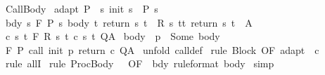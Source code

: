\begin{isabellebody}
%
\endisatagproof
{\isafoldproof}%
%
\isadelimproof
\isanewline
%
\endisadelimproof
\isanewline
{}\isamarkupfalse%
\ CallBody{\isacharcolon}\isanewline
{}\ adapt{\isacharcolon}\ {\isachardoublequoteopen}P\ {\isasymsubseteq}\ {\isacharbraceleft}s{\isachardot}\ init\ s\ {\isasymin}\ P{\isacharprime}\ s{\isacharbraceright}{\isachardoublequoteclose}\isanewline
{}\ bdy{\isacharcolon}\ {\isachardoublequoteopen}{\isasymforall}s{\isachardot}\ {\isasymGamma}{\isacharcomma}{\isasymTheta}{\isasymturnstile}\isactrlbsub {\isacharslash}F\isactrlesub \ {\isacharparenleft}P{\isacharprime}\ s{\isacharparenright}\ body\ {\isacharbraceleft}t{\isachardot}\ return\ s\ t\ {\isasymin}\ R\ s\ t{\isacharbraceright}{\isacharcomma}{\isacharbraceleft}t{\isachardot}\ return\ s\ t\ {\isasymin}\ A{\isacharbraceright}{\isachardoublequoteclose}\isanewline
{}\ c{\isacharcolon}\ {\isachardoublequoteopen}{\isasymforall}s\ t{\isachardot}\ {\isasymGamma}{\isacharcomma}{\isasymTheta}{\isasymturnstile}\isactrlbsub {\isacharslash}F\isactrlesub \ {\isacharparenleft}R\ s\ t{\isacharparenright}\ {\isacharparenleft}c\ s\ t{\isacharparenright}\ Q{\isacharcomma}A{\isachardoublequoteclose}\isanewline
{}\ body{\isacharcolon}\ {\isachardoublequoteopen}{\isasymGamma}\ p\ {\isacharequal}\ Some\ body{\isachardoublequoteclose}\isanewline
{}\ {\isachardoublequoteopen}{\isasymGamma}{\isacharcomma}{\isasymTheta}{\isasymturnstile}\isactrlbsub {\isacharslash}F\isactrlesub \ P\ {\isacharparenleft}call\ init\ p\ return\ c{\isacharparenright}\ Q{\isacharcomma}A{\isachardoublequoteclose}\isanewline
%
\isadelimproof
%
\endisadelimproof
%
\isatagproof
{}\isamarkupfalse%
\ {\isacharparenleft}unfold\ call{\isacharunderscore}def{\isacharparenright}\isanewline
{}\isamarkupfalse%
\ {\isacharparenleft}rule\ Block\ {\isacharbrackleft}OF\ adapt\ {\isacharunderscore}\ c{\isacharbrackright}{\isacharparenright}\isanewline
{}\isamarkupfalse%
\ {\isacharparenleft}rule\ allI{\isacharparenright}\isanewline
{}\isamarkupfalse%
\ {\isacharparenleft}rule\ ProcBody\ {\isacharbrackleft}\ {\isasymGamma}{\isacharequal}{\isasymGamma}{\isacharcomma}\ OF\ {\isacharunderscore}\ bdy\ {\isacharbrackleft}rule{\isacharunderscore}format{\isacharbrackright}\ body{\isacharbrackright}{\isacharparenright}\isanewline
{}\isamarkupfalse%
\ simp\isanewline
{}\isamarkupfalse%
%
\endisatagproof
{\isafoldproof}%
%
\isadelimproof
\isanewline
%
\endisadelimproof

\end{isabellebody}
